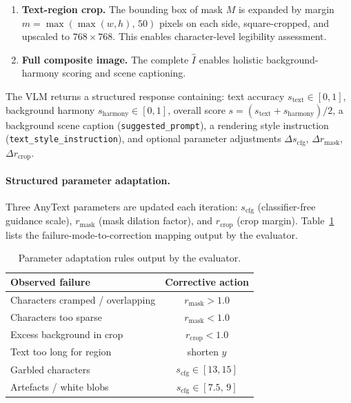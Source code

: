 \documentclass[uplatex,10pt,twocolumn,a4paper]{article}
\begin{document}
\begin{enumerate}
  \item \textbf{Text-region crop.}
    The bounding box of mask $M$ is expanded by margin
    $m = \max(\max(w, h),\, 50)$ pixels on each side,
    square-cropped, and upscaled to $768\times768$.
    This enables character-level legibility assessment.
  \item \textbf{Full composite image.}
    The complete $\hat{I}$ enables holistic background-harmony scoring
    and scene captioning.
\end{enumerate}

The VLM returns a structured response containing:
text accuracy $s_\mathrm{text} \in [0,1]$,
background harmony $s_\mathrm{harmony} \in [0,1]$,
overall score $s = (s_\mathrm{text} + s_\mathrm{harmony})/2$,
a background scene caption (\texttt{suggested\_prompt}),
a rendering style instruction (\texttt{text\_style\_instruction}),
and optional parameter adjustments
$\Delta s_\mathrm{cfg}$, $\Delta r_\mathrm{mask}$,
$\Delta r_\mathrm{crop}$.

\paragraph{Structured parameter adaptation.}
Three AnyText parameters are updated each iteration:
$s_\mathrm{cfg}$ (classifier-free guidance scale),
$r_\mathrm{mask}$ (mask dilation factor), and
$r_\mathrm{crop}$ (crop margin).
Table~\ref{tab:rules} lists the failure-mode-to-correction mapping
output by the evaluator.

\begin{table}[t]
  \centering
  \caption{Parameter adaptation rules output by the evaluator.}
  \label{tab:rules}
  \small
  \begin{tabular}{lc}
    \toprule
    Observed failure & Corrective action \\
    \midrule
    Characters cramped / overlapping & $r_\mathrm{mask} > 1.0$ \\
    Characters too sparse            & $r_\mathrm{mask} < 1.0$ \\
    Excess background in crop        & $r_\mathrm{crop} < 1.0$ \\
    Text too long for region         & shorten $y$ \\
    Garbled characters               & $s_\mathrm{cfg} \in [13,15]$ \\
    Artefacts / white blobs          & $s_\mathrm{cfg} \in [7.5,\,9]$ \\
    \bottomrule
  \end{tabular}
\end{table}
\end{document}
